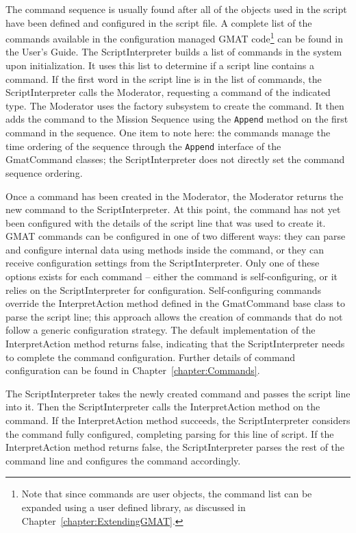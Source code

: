 \noindent The command sequence is usually found after all of the objects used in the script have
been defined and configured in the script file.  A complete list of the commands available in the
configuration managed GMAT code\footnote{Note that since commands are user objects, the command list
can be expanded using a user defined library, as discussed in Chapter~\ref{chapter:ExtendingGMAT}.}
can be found in the User's Guide\cite{userGuide}. The ScriptInterpreter builds a list of commands in
the system upon initialization.  It uses this list to determine if a script line contains a command.
 If the first word in the script line is in the list of commands, the ScriptInterpreter calls the
Moderator, requesting a command of the indicated type.  The Moderator uses the factory subsystem to
create the command.  It then adds the command to the Mission Sequence using the \texttt{Append}
method on the first command in the sequence.  One item to note here: the commands manage the time
ordering of the sequence through the \texttt{Append} interface of the GmatCommand classes; the
ScriptInterpreter does not directly set the command sequence ordering.

Once a command has been created in the Moderator, the Moderator returns the new command to the
ScriptInterpreter.  At this point, the command has not yet been configured with the details of the
script line that was used to create it.  GMAT commands can be configured in one of two different
ways: they can parse and configure internal data using methods inside the command, or they can
receive configuration settings from the ScriptInterpreter.  Only one of these options exists for
each command -- either the command is self-configuring, or it relies on the ScriptInterpreter for
configuration. Self-configuring commands override the InterpretAction method defined in the
GmatCommand base class to parse the script line; this approach allows the creation of commands that
do not follow a generic configuration strategy.  The default implementation of the InterpretAction
method returns false, indicating that the ScriptInterpreter needs to complete the command
configuration.  Further details of command configuration can be found in
Chapter~\ref{chapter:Commands}.

The ScriptInterpreter takes the newly created command and passes the script line into it.  Then
the ScriptInterpreter calls the InterpretAction method on the command.  If the InterpretAction
method succeeds, the ScriptInterpreter considers the command fully configured, completing parsing
for this line of script.  If the InterpretAction method returns false, the ScriptInterpreter parses
the rest of the command line and configures the command accordingly.


